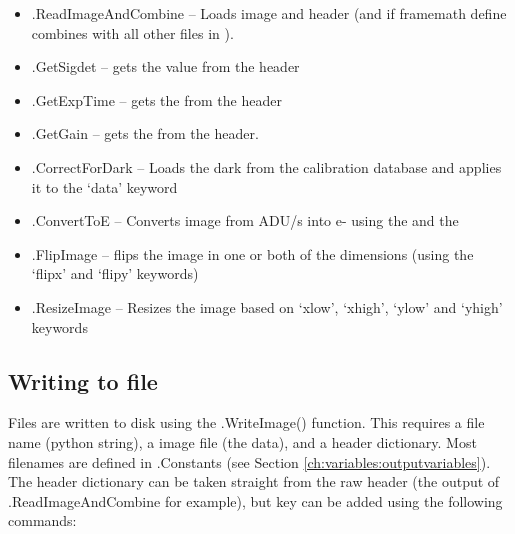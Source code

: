 \begin{itemize}

	\item \spirouImage.ReadImageAndCombine -- Loads  image and header (and if framemath define combines with all other files in ).

	\item \spirouImage.GetSigdet -- gets the  value from the  header

	\item \spirouImage.GetExpTime -- gets the  from the  header

	\item \spirouImage.GetGain -- gets the  from the  header.

	\item \spirouImage.CorrectForDark -- Loads the dark from the calibration database and applies it to the `data' keyword

	\item \spirouImage.ConvertToE -- Converts image from ADU/s into e- using the  and  the 

	\item \spirouImage.FlipImage -- flips the image in one or both of the dimensions (using the `flipx' and `flipy' keywords)
 
	\item \spirouImage.ResizeImage -- Resizes the image based on `xlow', `xhigh', `ylow' and `yhigh' keywords

\end{itemize}


\clearpage
\newpage
\subsection{Writing to file}
\label{ch:the_recipes:gen_layout:writing_to_file}

Files are written to disk using the \spirouImage.WriteImage() function. This requires a file name (python string), a image file (the data), and a header dictionary. Most filenames are defined in \spirouConfig.Constants (see Section \ref{ch:variables:outputvariables}). The header dictionary can be taken straight from the raw  header (the output of \spirouImage.ReadImageAndCombine for example), but key can be added using the following commands:

